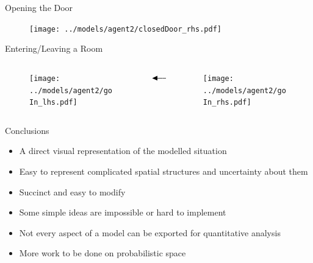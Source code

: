 \documentclass{beamer}
\newcommand\pro{\item[\textcolor{green}{$+$}]}
\newcommand\con{\item[\textcolor{red}{$-$}]}
\providecommand\longdoublearrowRHD{\mathrel\LHD\joinrel\relbar\joinrel\relbar\joinrel\mathrel\RHD}
\begin{document}
\begin{frame}{Opening the Door}
  \begin{figure}
    \centering
    \texttt{[image: ../models/agent2/closedDoor\_rhs.pdf]}
  \end{figure}
\end{frame}

\begin{frame}{Entering/Leaving a Room}
  \begin{columns}
    \begin{column}{0.45\textwidth}
      \begin{figure}
        \centering
        \texttt{[image: ../models/agent2/goIn\_lhs.pdf]}
      \end{figure}
    \end{column}
    \begin{column}{0.1\textwidth}
      $\longdoublearrowRHD$
    \end{column}
    \begin{column}{0.45\textwidth}
      \begin{figure}
        \centering
        \texttt{[image: ../models/agent2/goIn\_rhs.pdf]}
      \end{figure}
    \end{column}
  \end{columns}
\end{frame}

\begin{frame}{Conclusions}
  \begin{itemize}
    \pro A direct visual representation of the modelled situation
    \pro Easy to represent complicated spatial structures and uncertainty about
    them
    \pro Succinct and easy to modify
    \con Some simple ideas are impossible or hard to implement
    \con Not every aspect of a model can be exported for quantitative analysis
    \item More work to be done on probabilistic space
  \end{itemize}
\end{frame}
\end{document}
